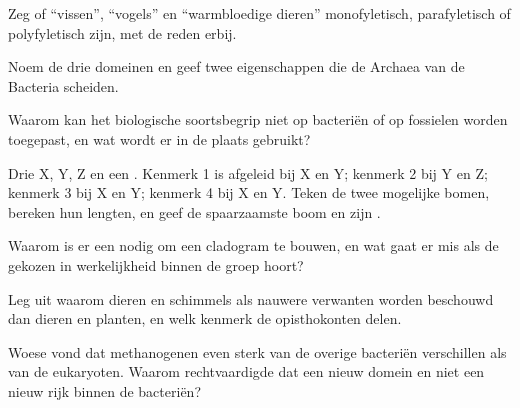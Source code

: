 \begin{exercise}[$\star$]\label{exo:b1:classifying-biodiversity:3}
Zeg of ``vissen'', ``vogels'' en ``warmbloedige dieren'' monofyletisch,
parafyletisch of polyfyletisch zijn, met de reden erbij.
\end{exercise}

\begin{exercise}[$\star$]\label{exo:b1:classifying-biodiversity:4}
Noem de drie domeinen en geef twee eigenschappen die de Archaea van de
Bacteria scheiden.
\end{exercise}

\begin{exercise}[$\star\star$]\label{exo:b1:classifying-biodiversity:5}
Waarom kan het biologische soortsbegrip niet op bacteriën of op fossielen
worden toegepast, en wat wordt er in de plaats gebruikt?
\end{exercise}

\begin{exercise}[$\star\star$]\label{exo:b1:classifying-biodiversity:6}
Drie  X, Y, Z en een . Kenmerk 1 is afgeleid bij X en Y;
kenmerk 2 bij Y en Z; kenmerk 3 bij X en Y; kenmerk 4 bij X en Y. Teken de
twee mogelijke bomen, bereken hun lengten, en geef de spaarzaamste boom en
zijn .
\end{exercise}

\begin{exercise}[$\star\star$]\label{exo:b1:classifying-biodiversity:7}
Waarom is er een  nodig om een cladogram te bouwen, en wat gaat er
mis als de gekozen  in werkelijkheid binnen de groep hoort?
\end{exercise}

\begin{exercise}[$\star\star$]\label{exo:b1:classifying-biodiversity:8}
Leg uit waarom dieren en schimmels als nauwere verwanten worden beschouwd dan
dieren en planten, en welk kenmerk de opisthokonten delen.
\end{exercise}

\begin{exercise}[$\star\star$]\label{exo:b1:classifying-biodiversity:9}
Woese vond dat methanogenen even sterk van de overige bacteriën verschillen
als van de eukaryoten. Waarom rechtvaardigde dat een nieuw domein en niet een
nieuw rijk binnen de bacteriën?
\end{exercise}

